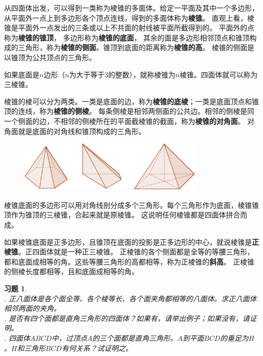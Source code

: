 \documentclass[12pt,UTF8]{ctexbook}
\newtheorem{xt}{习题}[section]
\begin{document}
从四面体出发，可以得到一类称为棱锥的多面体。给定一平面及其中一个多边形，
从平面外一点上到多边形各个顶点连线，得到的多面体称为\textbf{棱锥}。
直观上看，棱锥是平面外一点发出的三条或以上不共面的射线被平面所截得到的。
平面外的点称为\textbf{棱锥的锥顶}，
多边形称为\textbf{棱锥的底面}，
其余的面是多边形相邻顶点和锥顶构成的三角形，称为\textbf{棱锥的侧面}。锥顶到底面的距离称为\textbf{棱锥的高}。
棱锥的侧面是以锥顶为公共顶点的三角形。

如果底面是$n$边形（$n$为大于等于$3$的整数），就称棱锥为$n$棱锥。四面体就可以称为三棱锥。

棱锥的棱可以分为两类。一类是底面的边，称为\textbf{棱锥的底棱}；一类是底面顶点和锥顶的连线，称为\textbf{棱锥的侧棱}。
每条侧棱是相邻两侧面的公共边。相邻的侧棱是同一个侧面的边，不相邻的侧棱所在的平面截棱锥的截面，称为\textbf{棱锥的对角面}。
对角面就是底面的对角线和锥顶构成的三角形。

\begin{figure}[h] 
    \centering
    \includegraphics[width=0.8\textwidth]{棱锥1.png}
\end{figure}

棱锥底面的多边形可以用对角线剖分成多个三角形。每个三角形作为底面，棱锥锥顶作为锥顶的三棱锥，合起来就是原棱锥。
这说明任何棱锥都是四面体拼合而成。

如果棱锥底面是正多边形，且锥顶在底面的投影是正多边形的中心，就说棱锥是\textbf{正棱锥}。正四面体就是一种正三棱锥。
正棱锥的各个侧面都是全等的等腰三角形，都和底面成相等的角。这些等腰三角形的高都相等，称为正棱锥的\textbf{斜高}。
正棱锥的侧棱长度都相等，且和底面成相等的角。
\begin{xt}
    \mbox{}\\
    . 正八面体是各个面全等、各个棱等长、各个面夹角都相等的八面体。求正八面体相邻两面的夹角。\\
    . 是否有四个面都是直角三角形的四面体？如果有，请举出例子；如果没有，请证明。\\
    . 四面体$ABCD$中，过顶点$A$的三个面都是直角三角形。$A$到平面$BCD$的垂足为$H$。$H$和三角形$BCD$有何关系？试证明之。
\end{xt}
\end{document}
